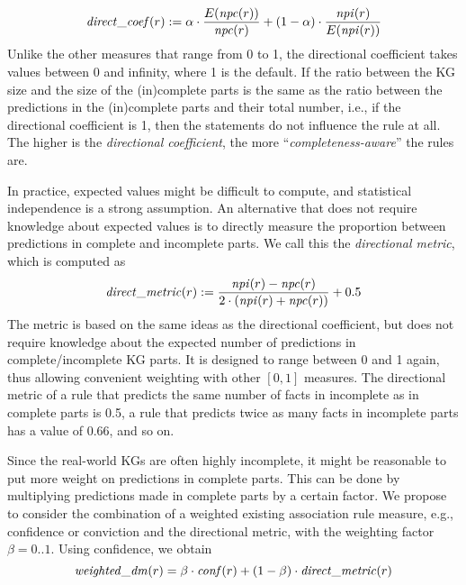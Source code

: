 \begin{equation}\label{eq:direct_coef}
\mathit{direct\_coef}(r) := \alpha \cdot \frac{E(\mathit{npc}(r))}{\mathit{npc}(r)} + (1-\alpha) \cdot \frac{\mathit{npi}(r)}{E(\mathit{npi}(r))}
\end{equation}
Unlike the other measures that range from 0 to 1, the directional coefficient takes values between 0 and infinity, where 1 is the default. If the ratio between the KG size and the size of the (in)complete parts is the same as the ratio between the %
predictions in the (in)complete parts and their total number, i.e.,
if the directional coefficient is 1, then the statements do not influence the rule at all.
The higher is the \emph{directional coefficient}, the more ``\emph{completeness-aware}'' the rules are.

In practice, expected values might be difficult to compute, and statistical independence is a strong assumption. An alternative that does not require knowledge about expected values is to directly measure the proportion between predictions in complete and incomplete parts. We call this the \emph{directional metric}, which is computed as
%
\begin{equation}\label{eq:direct_metric}
\mathit{direct\_metric}(r) := \frac{\mathit{npi}(r)-\mathit{npc}(r)}{2\cdot(\mathit{npi}(r)+\mathit{npc}(r))}+0.5\\
\end{equation}
%
 The metric is based on the same ideas as the directional coefficient, but does not require knowledge about the expected number of predictions in complete/incomplete KG parts. It is designed to range between 0 and 1 again, thus allowing convenient weighting with other $[0, 1]$  measures.
The directional metric of a rule that predicts the same number of facts in incomplete as in complete parts is %
0.5, a rule that predicts twice as many facts in incomplete parts has a value of 0.66, and so on.

Since the real-world KGs are often highly incomplete, it might be reasonable to put more weight on predictions in complete parts.
This can be done by multiplying predictions made in complete parts by a certain factor. We propose to consider the combination of a weighted existing association rule measure, 
e.g., confidence or conviction and 
the directional metric, %
with the weighting factor  %
$\beta=0..1$. Using confidence, we obtain  
\begin{equation}\label{eq:direct_metric_score}
\mathit{weighted\_dm}(r)=\beta \cdot \mathit{conf}(r) + (1-\beta) \cdot \mathit{direct\_metric}(r) 
\end{equation}


